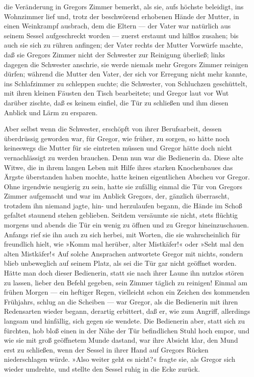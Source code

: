 die Veränderung in Gregors Zimmer bemerkt, als sie, aufs höchste
beleidigt, ins Wohnzimmer lief und, trotz der beschwörend erhobenen
Hände der Mutter, in einen Weinkrampf ausbrach, dem die Eltern --- der
Vater war natürlich aus seinem Sessel aufgeschreckt worden --- zuerst
erstaunt und hilflos zusahen; bis auch sie sich zu rühren anfingen; der
Vater rechts der Mutter Vorwürfe machte, daß sie Gregors Zimmer nicht
der Schwester zur Reinigung überließ; links dagegen die Schwester
anschrie, sie werde niemals mehr Gregors Zimmer reinigen dürfen; während
die Mutter den Vater, der sich vor Erregung nicht mehr kannte, ins
Schlafzimmer zu schleppen suchte; die Schwester, von Schluchzen
geschüttelt, mit ihren kleinen Fäusten den Tisch bearbeitete; und Gregor
laut vor Wut darüber zischte, daß es keinem einfiel, die Tür zu
schließen und ihm diesen Anblick und Lärm zu ersparen.

Aber selbst wenn die Schwester, erschöpft von ihrer Berufsarbeit, dessen
überdrüssig geworden war, für Gregor, wie früher, zu sorgen, so hätte
noch keineswegs die Mutter für sie eintreten müssen und Gregor hätte
doch nicht vernachlässigt zu werden brauchen. Denn nun war die
Bedienerin da. Diese alte Witwe, die in ihrem langen Leben mit Hilfe
ihres starken Knochenbaues das Ärgste überstanden haben mochte, hatte
keinen eigentlichen Abscheu vor Gregor. Ohne irgendwie neugierig zu
sein, hatte sie zufällig einmal die Tür von Gregors Zimmer aufgemacht
und war im Anblick Gregors, der, gänzlich überrascht, trotzdem ihn
niemand jagte, hin- und herzulaufen begann, die Hände im Schoß gefaltet
staunend stehen geblieben. Seitdem versäumte sie nicht, stets flüchtig
morgens und abends die Tür ein wenig zu öffnen und zu Gregor
hineinzuschauen. Anfangs rief sie ihn auch zu sich herbei, mit Worten,
die sie wahrscheinlich für freundlich hielt, wie »Komm mal herüber,
alter Mistkäfer!« oder »Seht mal den alten Mistkäfer!« Auf solche
Ansprachen antwortete Gregor mit nichts, sondern blieb unbeweglich auf
seinem Platz, als sei die Tür gar nicht geöffnet worden. Hätte man doch
dieser Bedienerin, statt sie nach ihrer Laune ihn nutzlos stören zu
lassen, lieber den Befehl gegeben, sein Zimmer täglich zu reinigen!
Einmal am frühen Morgen --- ein heftiger Regen, vielleicht schon ein
Zeichen des kommenden Frühjahrs, schlug an die Scheiben --- war Gregor,
als die Bedienerin mit ihren Redensarten wieder begann, derartig
erbittert, daß er, wie zum Angriff, allerdings langsam und hinfällig,
sich gegen sie wendete. Die Bedienerin aber, statt sich zu fürchten, hob
bloß einen in der Nähe der Tür befindlichen Stuhl hoch empor, und wie
sie mit groß geöffnetem Munde dastand, war ihre Absicht klar, den Mund
erst zu schließen, wenn der Sessel in ihrer Hand auf Gregors Rücken
niederschlagen würde. »Also weiter geht es nicht?« fragte sie, als
Gregor sich wieder umdrehte, und stellte den Sessel ruhig in die Ecke
zurück.

